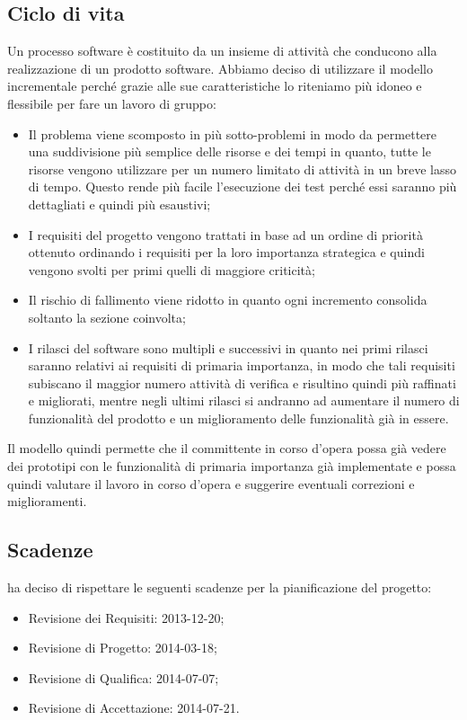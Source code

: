\subsection{Ciclo di vita}
\label{3.5}
Un processo software è costituito da un insieme di attività che conducono alla realizzazione di un prodotto software. Abbiamo deciso di utilizzare il modello incrementale perché grazie alle sue caratteristiche lo riteniamo più idoneo e flessibile per fare un lavoro di gruppo:
\begin{itemize}
\item Il problema viene scomposto in più sotto-problemi in modo da permettere una suddivisione più semplice delle risorse e dei tempi in quanto, tutte le risorse vengono utilizzare per un numero limitato di attività in un breve lasso di tempo. Questo rende più facile l'esecuzione dei test perché essi saranno più dettagliati e quindi più esaustivi;
\item I requisiti del progetto vengono trattati in base ad un ordine di priorità ottenuto ordinando i requisiti per la loro importanza strategica e quindi vengono svolti per primi quelli di maggiore criticità;
\item Il rischio di fallimento viene ridotto in quanto ogni incremento consolida soltanto la sezione coinvolta;
\item I rilasci del software sono multipli e successivi in quanto nei primi rilasci saranno relativi ai requisiti di primaria importanza, in modo che tali requisiti subiscano il maggior numero attività di verifica e risultino quindi più raffinati e migliorati, mentre negli ultimi rilasci si andranno ad aumentare il numero di funzionalità del prodotto e un miglioramento delle funzionalità già in essere.
\end{itemize}

Il modello quindi permette che il committente in corso d'opera possa già vedere dei prototipi con le funzionalità di primaria importanza già implementate e possa quindi valutare il lavoro in corso d'opera e suggerire eventuali correzioni e miglioramenti.


\subsection{Scadenze}
\label{3.6}
\NomeGruppo{} ha deciso di rispettare le seguenti scadenze per la pianificazione del progetto:
\begin{itemize}
\item Revisione dei Requisiti: 2013-12-20;
\item Revisione di Progetto:  2014-03-18;
\item Revisione di Qualifica: 2014-07-07;
\item Revisione di Accettazione: 2014-07-21.
\end{itemize}

